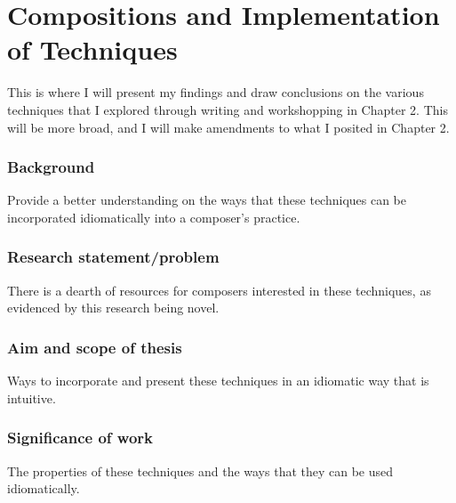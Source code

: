 

\chapter{Compositions and Implementation of Techniques}
This is where I will present my findings and draw conclusions on the various techniques that I explored through writing and workshopping in Chapter 2. This will be more broad, and I will make amendments to what I posited in Chapter 2. \lipsum[5]
\subsection{Background}
Provide a better understanding on the ways that these techniques can be incorporated idiomatically into a composer's practice.

\subsection{Research statement/problem}
There is a dearth of resources for composers interested in these techniques, as evidenced by this research being novel.

\subsection{Aim and scope of thesis}
Ways to incorporate and present these techniques in an idiomatic way that is intuitive.

\subsection{Significance of work}
The properties of these techniques and the ways that they can be used idiomatically.


\lipsum[4]
